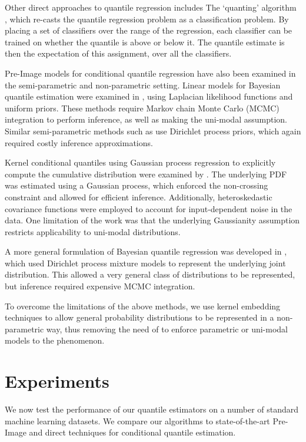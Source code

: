 \documentclass[twoside]{article} \usepackage{aistats2017}
\theoremstyle{definition}
\theoremstyle{theorem}
\begin{document}
	Other direct approaches to quantile regression includes The `quanting' algorithm \citep{Langford2006}, which re-casts the quantile regression problem as a classification problem. By placing a set of classifiers over the range of the regression, each classifier can be trained on whether the quantile is above or below it. The quantile estimate is then the expectation of this assignment, over all the classifiers.

	Pre-Image models for conditional quantile regression have also been examined in the semi-parametric and non-parametric setting. Linear models for Bayesian quantile estimation were examined in \cite{Yu2001}, using Laplacian likelihood functions and uniform priors. These methods require Markov chain Monte Carlo (MCMC) integration to perform inference, as well as making the uni-modal assumption. Similar semi-parametric methods such as \cite{Hjort2006, Hjort2009} use Dirichlet process priors, which again required costly inference approximations.
	
	Kernel conditional quantiles using Gaussian process regression to explicitly compute the cumulative distribution were examined by \cite{Quadrianto2009}. The underlying PDF was estimated using a Gaussian process, which enforced the non-crossing constraint and allowed for efficient inference. Additionally, heteroskedastic covariance functions were employed to account for input-dependent noise in the data. One limitation of the work was that the underlying Gaussianity assumption restricts applicability to uni-modal distributions.
	
	A more general formulation of Bayesian quantile regression was developed in \cite{Taddy2010}, which used Dirichlet process mixture models to represent the underlying joint distribution. This allowed a very general class of distributions to be represented, but inference required expensive MCMC integration.
	
	To overcome the limitations of the above methods, we use kernel embedding techniques to allow general probability distributions to be represented in a non-parametric way, thus removing the need of to enforce parametric or uni-modal models to the phenomenon.
	
\section{Experiments}
\label{sec:experiments}

	We now test the performance of our quantile estimators on a number of standard machine learning datasets. We compare our algorithms to state-of-the-art Pre-Image and direct techniques for conditional quantile estimation.
	
\end{document}
